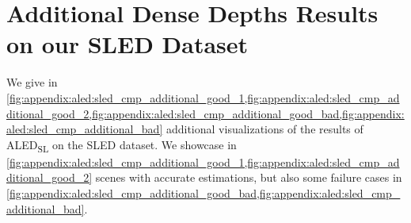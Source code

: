 \section{Additional Dense Depths Results on our SLED Dataset}\label{sec:appendix:aled:sled_cmp_additional}
We give in \cref{fig:appendix:aled:sled_cmp_additional_good_1,fig:appendix:aled:sled_cmp_additional_good_2,fig:appendix:aled:sled_cmp_additional_good_bad,fig:appendix:aled:sled_cmp_additional_bad} additional visualizations of the results of ALED\textsubscript{SL} on the SLED dataset. We showcase in \cref{fig:appendix:aled:sled_cmp_additional_good_1,fig:appendix:aled:sled_cmp_additional_good_2} scenes with accurate estimations, but also some failure cases in \cref{fig:appendix:aled:sled_cmp_additional_good_bad,fig:appendix:aled:sled_cmp_additional_bad}.

